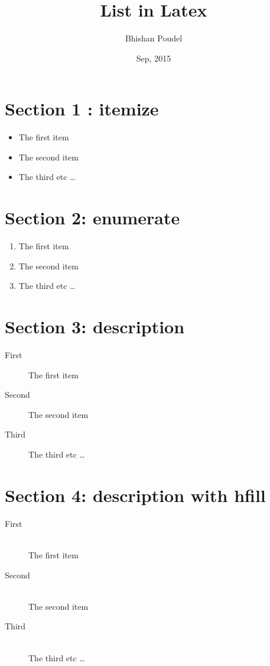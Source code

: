 \documentclass[14pt]{article}
\title{ List in Latex }
\author{Bhishan Poudel}
\date{Sep, 2015}
\begin{document}
\maketitle



\section{Section 1 : itemize}
\begin{itemize}            %
  \item The first item
  \item The second item
  \item The third etc \ldots
\end{itemize}


\section{Section 2: enumerate}

\begin{enumerate}
  \item The first item
  \item The second item
  \item The third etc \ldots
\end{enumerate}


\section {Section 3: description}

\begin{description}
  \item[First] The first item
  \item[Second] The second item
  \item[Third] The third etc \ldots
\end{description}


\section{Section 4: description with hfill}
\begin{description}
  \item[First] \hfill \\  %
  The first item
  \item[Second] \hfill \\
  The second item
  \item[Third] \hfill \\
  The third etc \ldots
\end{description}
\end{document}
